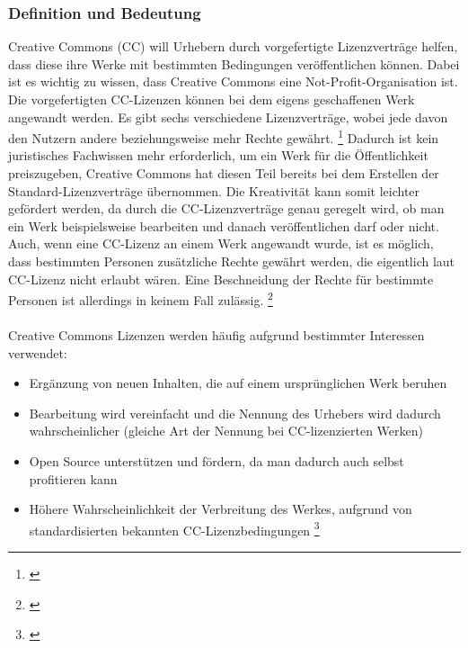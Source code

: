 \documentclass[titlepage,12pt,twoside]{article}
\begin{document}
\subsubsection{Definition und Bedeutung}
Creative Commons (CC) will Urhebern durch vorgefertigte Lizenzverträge helfen, dass diese ihre Werke mit 
bestimmten Bedingungen veröffentlichen können. Dabei ist es wichtig zu wissen, dass Creative Commons eine 
Not-Profit-Organisation ist. Die vorgefertigten CC-Lizenzen können bei dem eigens geschaffenen Werk angewandt 
werden. Es gibt sechs verschiedene Lizenzverträge, wobei jede davon den Nutzern andere beziehungsweise mehr 
Rechte gewährt. \footnote{\cite{CreativeCommons35}}  Dadurch ist kein juristisches Fachwissen mehr erforderlich, um ein Werk für die 
Öffentlichkeit preiszugeben, Creative Commons hat diesen Teil bereits bei dem Erstellen der 
Standard-Lizenzverträge übernommen. Die Kreativität kann somit leichter gefördert werden, da durch die 
CC-Lizenzverträge genau geregelt wird, ob man ein Werk beispielsweise bearbeiten und danach veröffentlichen 
darf oder nicht. Auch, wenn eine CC-Lizenz an einem Werk angewandt wurde, ist es möglich, dass bestimmten 
Personen zusätzliche Rechte gewährt werden, die eigentlich laut CC-Lizenz nicht erlaubt wären. Eine 
Beschneidung der Rechte für bestimmte Personen ist allerdings in keinem Fall zulässig. \footnote{\cite{CreativeCommons36}} \\
\\
Creative Commons Lizenzen werden häufig aufgrund bestimmter Interessen verwendet: \\
\begin{itemize}
	\item Ergänzung von neuen Inhalten, die auf einem ursprünglichen Werk beruhen
	\item Bearbeitung wird vereinfacht und die Nennung des Urhebers wird dadurch wahrscheinlicher (gleiche Art der Nennung bei CC-lizenzierten Werken)
	\item Open Source unterstützen und fördern, da man dadurch auch selbst profitieren kann
	\item Höhere Wahrscheinlichkeit der Verbreitung des Werkes, aufgrund von standardisierten bekannten CC-Lizenzbedingungen \footnote{\cite{CreativeCommons37}}
\end{itemize}
\hfill \break
\end{document}
